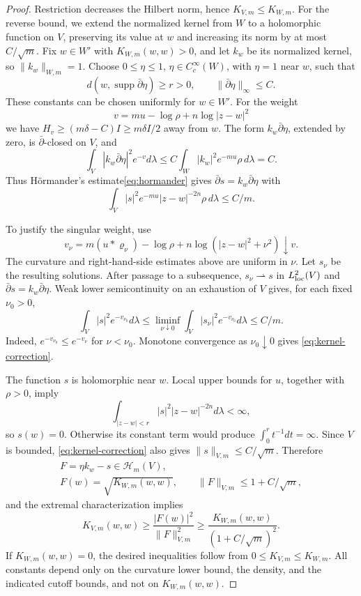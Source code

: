 \documentclass[reqno]{amsart}
\numberwithin{equation}{section}
\theoremstyle{definition}
\begin{document}
\begin{proof}
Restriction decreases the Hilbert norm, hence
$K_{V,m}\le K_{W,m}$.
For the reverse bound, we extend the normalized kernel from
$W$ to a holomorphic function on $V$, preserving its value
at $w$ and increasing its norm by at most $C/\sqrt m$.
Fix $w\in W'$ with $K_{W,m}(w,w)>0$, and let $k_w$ be its
normalized kernel, so $\|k_w\|_{W,m}=1$.
Choose $0\le\eta\le1$, $\eta\in C_c^\infty(W)$, with
$\eta=1$ near $w$, such that
\[
d(w,\operatorname{supp}\bar\partial\eta)\ge r>0,\qquad
\|\bar\partial\eta\|_\infty\le C.
\]
These constants can be chosen uniformly for $w\in W'$.
For the weight
\[
v=mu-\log\rho+n\log|z-w|^2
\]
we have $H_v\ge(m\delta-C)I\ge m\delta I/2$ away from $w$.
The form $k_w\bar\partial\eta$, extended by zero, is
$\bar\partial$-closed on $V$, and
\[
\int_V|k_w\bar\partial\eta|^2e^{-v}d\lambda
\le C\int_W|k_w|^2e^{-mu}\rho\,d\lambda=C.
\]
Thus H\"ormander's estimate\eqref{eq:hormander} gives
$\bar\partial s=k_w\bar\partial\eta$ with
\begin{equation}\label{eq:kernel-correction}
\int_V|s|^2e^{-mu}|z-w|^{-2n}\rho\,d\lambda\le C/m.
\end{equation}

To justify the singular weight, use
\[
v_\nu=m(u*\varrho_\nu)-\log\rho
      +n\log(|z-w|^2+\nu^2)\downarrow v.
\]
The curvature and right-hand-side estimates above are uniform in
$\nu$. Let $s_\nu$ be the resulting solutions. After passage to
a subsequence, $s_\nu\rightharpoonup s$ in $L^2_{\rm loc}(V)$
and $\bar\partial s=k_w\bar\partial\eta$.
Weak lower semicontinuity on an exhaustion of $V$ gives, for
each fixed $\nu_0>0$,
\[
\int_V|s|^2e^{-v_{\nu_0}}d\lambda
\le\liminf_{\nu\downarrow0}
 \int_V|s_\nu|^2e^{-v_{\nu_0}}d\lambda
\le C/m.
\]
Indeed, $e^{-v_{\nu_0}}\le e^{-v_\nu}$ for $\nu<\nu_0$.
Monotone convergence as $\nu_0\downarrow0$ gives
\eqref{eq:kernel-correction}.

The function $s$ is holomorphic near $w$.
Local upper bounds for $u$, together with $\rho>0$, imply
\[
\int_{|z-w|<r}|s|^2|z-w|^{-2n}d\lambda<\infty,
\]
so $s(w)=0$. Otherwise its constant term would produce
$\int_0^r t^{-1}dt=\infty$.
Since $V$ is bounded, \eqref{eq:kernel-correction}
also gives $\|s\|_{V,m}\le C/\sqrt m$.
Therefore
\[
\begin{gathered}
F=\eta k_w-s\in\mathscr H_m(V),\\
F(w)=\sqrt{K_{W,m}(w,w)},\qquad
\|F\|_{V,m}\le1+C/\sqrt m,
\end{gathered}
\]
and the extremal characterization implies
\[
K_{V,m}(w,w)
\ge\frac{|F(w)|^2}{\|F\|_{V,m}^2}
\ge\frac{K_{W,m}(w,w)}{(1+C/\sqrt m)^2}.
\]
If $K_{W,m}(w,w)=0$, the desired inequalities follow from
$0\le K_{V,m}\le K_{W,m}$.
All constants depend only on the curvature lower bound, the density,
and the indicated cutoff bounds, and not on $K_{W,m}(w,w)$.
\end{proof}
\end{document}
